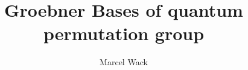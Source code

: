 \documentclass[12pt,usenames,dvipsnames]{amsart}
\begin{document}
 

\title{Groebner Bases of quantum permutation group}

\author[M. Wack]{Marcel Wack}


\address{M.W., Technische Universit\"at Berlin, Institut f\"ur Mathematik, Sekr. MA 6-2, Strasse des 17 Juni 136, 10623 Berlin}

\maketitle





\label{sec:biblio}
\end{document}
